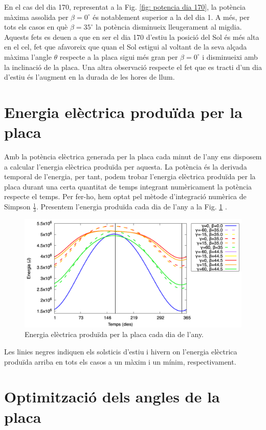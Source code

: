 \documentclass[11pt]{article}
\begin{document}
En el cas del dia 170, representat a la Fig. \ref{fig: potencia dia 170}, la potència màxima assolida per $\beta=0^{\circ}$ és notablement superior a la del dia 1. A més, per tots els casos en què $\beta=35^{\circ}$ la potència disminueix lleugerament al migdia. Aquests fets es deuen a que en ser el dia 170 d'estiu la posició del Sol és més alta en el cel, fet que afavoreix que quan el Sol estigui al voltant de la seva alçada màxima l’angle $\theta$ respecte a la placa sigui més gran per $\beta=0^{\circ}$ i disminueixi amb la inclinació de la placa. Una altra observació respecte el fet que es tracti d'un dia d'estiu és l’augment en la durada de les hores de llum.

\section{Energia elèctrica produïda per la placa}

Amb la potència elèctrica generada per la placa cada minut de l'any ens disposem a calcular l'energia elèctrica produïda per aquesta. La potència és la derivada temporal de l'energia, per tant, podem trobar l'energia elèctrica produïda per la placa durant una certa quantitat de temps integrant numèricament la potència respecte el temps. Per fer-ho, hem optat pel mètode d'integració numèrica de Simpson $\frac{1}{3}$. Presentem l'energia produïda cada dia de l'any a la Fig. \ref{fig: energies} .


\begin{figure}[h]
    \centering
    \includegraphics[width=0.75\linewidth]{energia.png}
    \caption{Energia elèctrica produïda per la placa cada dia de l'any.}
    \label{fig: energies}
\end{figure}

Les linies negres indiquen els solsticis d'estiu i hivern on l'energia elèctrica produïda arriba en tots els casos a un màxim i un mínim, respectivament.

\section{Optimització dels angles de la placa}
\end{document}
